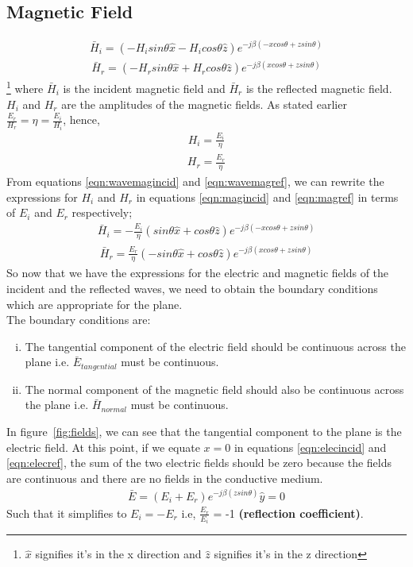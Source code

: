 \subsection{Magnetic Field}
\begin{align}
\bar{H}_i = (-H_i sin\theta \hat{x} - H_i cos\theta \hat{z}) e ^{-j\beta( -xcos\theta + zsin\theta)}
\label{eqn:magincid}
\end{align}
\begin{align}
\bar{H}_r = (-H_r sin\theta \hat{x} + H_r cos\theta \hat{z}) e ^{-j\beta( xcos\theta + zsin\theta)}
\label{eqn:magref}
\end{align}\footnote{$\hat{x}$ signifies it's in the x direction and $\hat{z}$ signifies it's in the z direction}
where $\bar{H}_i$ is the incident magnetic field and $\bar{H}_r$ is the reflected magnetic field. $H_i$ and $H_r$ are the amplitudes of the magnetic fields. As stated earlier $\frac{E_r}{H_r} = \eta = \frac{E_i}{H_i}$, hence, 
\begin{align}
H_i = \frac{E_i}{\eta}
\label{eqn:wavemagincid}
\end{align}
\begin{align}
H_r = \frac{E_r}{\eta}
\label{eqn:wavemagref}
\end{align}
From equations \eqref{eqn:wavemagincid} and \eqref{eqn:wavemagref}, we can rewrite the expressions for $H_i$ and $H_r$ in equations \eqref{eqn:magincid} and \eqref{eqn:magref} in terms of $E_i$ and $E_r$ respectively;
\begin{align}
\bar{H}_i = - \frac{E_i}{\eta} (sin\theta \hat{x} + cos\theta \hat{z})e^{-j\beta (-xcos\theta + zsin\theta)}
\end{align}
\begin{align}
\bar{H}_r =  \frac{E_r}{\eta} (-sin\theta \hat{x} + cos\theta \hat{z})e^{-j\beta (xcos\theta + zsin\theta)}
\end{align}
So now that we have the expressions for the electric and magnetic fields of the incident and the reflected waves, we need to obtain the boundary conditions which are appropriate for the plane.\\ 
The boundary conditions are:
\begin{enumerate}[(i)]
\item The tangential component of the electric field should be continuous across the plane i.e. $\bar{E}_{tangential}$ must be continuous.
\item The normal component of the magnetic field should also be continuous across the plane i.e. $\bar{H}_{normal}$ must be continuous.
\end{enumerate} 
In figure~\ref{fig:fields}, we can see that the tangential component to the plane is the electric field. At this point, if we equate $x = 0$ in equations \ref{eqn:elecincid} and \ref{eqn:elecref}, the sum of the two electric fields should be zero because the fields are continuous and there are no fields in the conductive medium.
\begin{align}
\bar{E} = (E_i + E_r) e^{-j\beta(zsin\theta) }\hat{y} = 0
\end{align}
Such that it simplifies to $E_i = - E_r$ i.e, $\frac{E_r}{E_i}$ = -1 \textbf{(reflection coefficient)}. 
 
